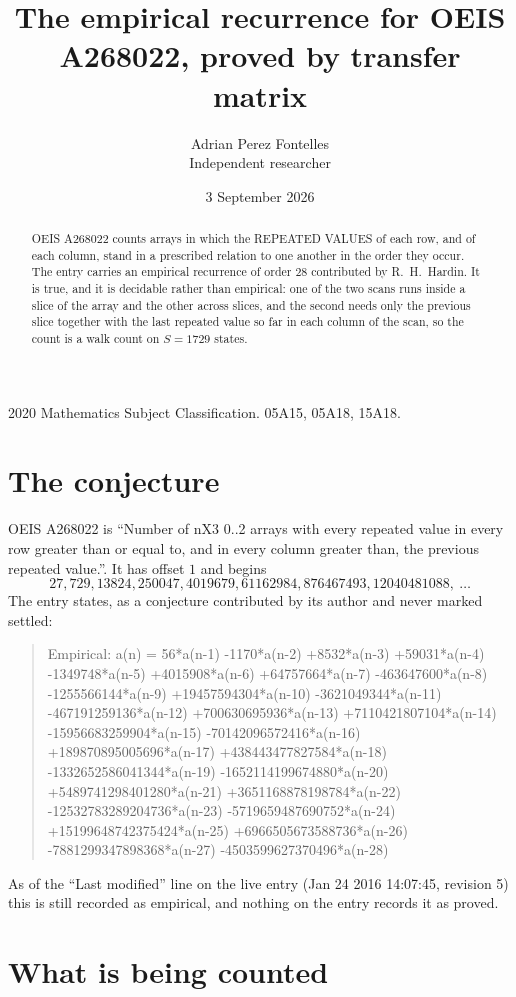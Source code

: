 \documentclass[11pt,a4paper]{article}
\title{The empirical recurrence for OEIS A268022, proved by transfer matrix}
\author{Adrian Perez Fontelles\\ \small Independent researcher}
\date{3 September 2026}
\theoremstyle{plain}
\theoremstyle{definition}
\begin{document}
\maketitle

\begin{abstract}
OEIS A268022 counts arrays in which the REPEATED VALUES of each row, and of each column, stand in a
prescribed relation to one another in the order they occur. The entry carries an empirical
recurrence of order $28$ contributed by R.~H.~Hardin. It is true, and it is decidable
rather than empirical: one of the two scans runs inside a slice of the array and the other
across slices, and the second needs only the previous slice together with the last repeated
value so far in each column of the scan, so the count is a walk count on $S=1729$ states.
\end{abstract}

\noindent\small 2020 Mathematics Subject Classification. 05A15, 05A18, 15A18.\normalsize

\section{The conjecture}

OEIS A268022 is ``Number of nX3 0..2 arrays with every repeated value in every row greater than or equal to, and in every column greater than, the previous repeated value.''. It has offset $1$ and begins
\[
27, 729, 13824, 250047, 4019679, 61162984, 876467493, 12040481088,\ \dots
\]
The entry states, as a conjecture contributed by its author and never marked settled:
\begin{quote}
Empirical: a(n) = 56*a(n-1) -1170*a(n-2) +8532*a(n-3) +59031*a(n-4) -1349748*a(n-5) +4015908*a(n-6) +64757664*a(n-7) -463647600*a(n-8) -1255566144*a(n-9) +19457594304*a(n-10) -3621049344*a(n-11) -467191259136*a(n-12) +700630695936*a(n-13) +7110421807104*a(n-14) -15956683259904*a(n-15) -70142096572416*a(n-16) +189870895005696*a(n-17) +438443477827584*a(n-18) -1332652586041344*a(n-19) -1652114199674880*a(n-20) +5489741298401280*a(n-21) +3651168878198784*a(n-22) -12532783289204736*a(n-23) -5719659487690752*a(n-24) +15199648742375424*a(n-25) +6966505673588736*a(n-26) -7881299347898368*a(n-27) -4503599627370496*a(n-28)
\end{quote}
As of the ``Last modified'' line on the live entry (Jan 24 2016 14:07:45, revision 5) this is still
recorded as empirical, and nothing on the entry records it as proved.

\section{What is being counted}
\end{document}
